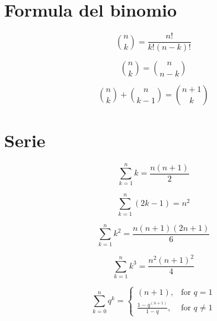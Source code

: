 \documentclass[../formulario.tex]{subfiles}
\begin{document}
\section{Formula del binomio}
\begin{multicols}{3}

\[ \binom{n}{k} = \frac{n!}{k!(n-k)!} \]

\[ \binom{n}{k} = \binom{n}{n-k} \]

\[ \binom{n}{k} + \binom{n}{k-1} = \binom{n+1}{k} \]

\end{multicols}

\section{Serie}	
\begin{multicols}{3}
	
\[ \sum_{k=1}^n k = \frac{n(n+1)}{2} \]

\[ \sum_{k=1}^n (2k-1) = n^2 \]

\[ \sum_{k=1}^n k^2 = \frac{n(n+1)(2n+1)}{6} \]

\[ \sum_{k=1}^n k^3 = \frac{n^2(n+1)^2}{4} \]

\[
\sum_{k=0}^{n}q^k = \begin{cases}
                         (n+1), & \text{for } q=1\\
                         \frac{1-q^{(n+1)}}{1-q}, & \text{for } q\neq1
                    \end{cases}
\]
	
\end{multicols}
\end{document}
